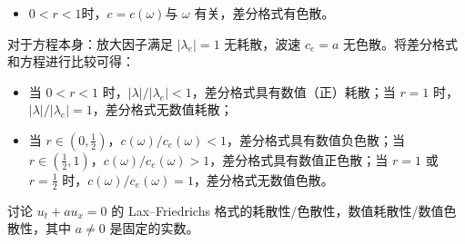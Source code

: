 \begin{solution*}
\begin{itemize}
        \item $0<r<1$时，$c = c(\omega)$与 $\omega$ 有关，差分格式有色散。
    \end{itemize}
    对于方程本身：放大因子满足 $|\lambda_e| = 1$ 无耗散，波速 $c_e = a$ 无色散。将差分格式和方程进行比较可得：
    \begin{itemize}
        \item 当 $0 < r < 1$ 时，$|\lambda| / |\lambda_e|  < 1$，差分格式具有数值（正）耗散；当 $r=1$ 时，$|\lambda| / |\lambda_e| = 1$，差分格式无数值耗散；
        \item 当 $r \in (0,\frac12)$，$c(\omega) / c_e(\omega) < 1$，差分格式具有数值负色散；当 $r \in (\frac12,1)$，$c(\omega) / c_e(\omega) > 1$，差分格式具有数值正色散；当 $r=1$ 或 $r = \frac12$ 时，$c(\omega) / c_e(\omega) = 1$，差分格式无数值色散。
    \end{itemize}
\end{solution*}


\begin{example}
    讨论 $u_t + a u_x = 0$ 的 Lax–Friedrichs 格式的耗散性/色散性，数值耗散性/数值色散性，其中 $a \neq 0$ 是固定的实数。
\end{example}

